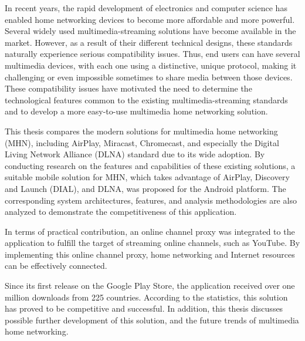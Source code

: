 In recent years, the rapid development of electronics and computer science has
enabled home networking devices to become more affordable and more powerful. 
Several widely used multimedia-streaming solutions have become available in the
market. However, as a result of their different technical designs, these
standards naturally experience serious compatibility issues. Thus, end users can
have several multimedia devices, with each one using a distinctive, unique
protocol, making it challenging or even impossible sometimes to share media
between those devices. These compatibility issues have motivated the need to
determine the technological features common to the existing
multimedia-streaming standards and to develop a more easy-to-use multimedia
home networking solution.

This thesis compares the modern solutions for multimedia home networking (MHN), including AirPlay, Miracast, Chromecast, and especially the Digital Living Network Alliance (DLNA) standard due to its wide adoption. By conducting research on the features and capabilities of these existing solutions, a suitable mobile solution for MHN, which takes advantage of AirPlay, Discovery and Launch (DIAL), and DLNA, was proposed for the Android platform. The corresponding system architectures, features, and analysis methodologies are also analyzed to demonstrate the competitiveness of this application. 

In terms of practical contribution, an online channel proxy was integrated to the application to fulfill the target of streaming online channels, such as YouTube. By implementing this online channel proxy, home networking and Internet resources can be effectively connected. 

Since its first release on the Google Play Store, the application received over one million downloads from 225 countries. According to the statistics, this solution has proved to be competitive and successful. In addition, this thesis discusses possible further development of this solution, and the future trends of multimedia home networking.
